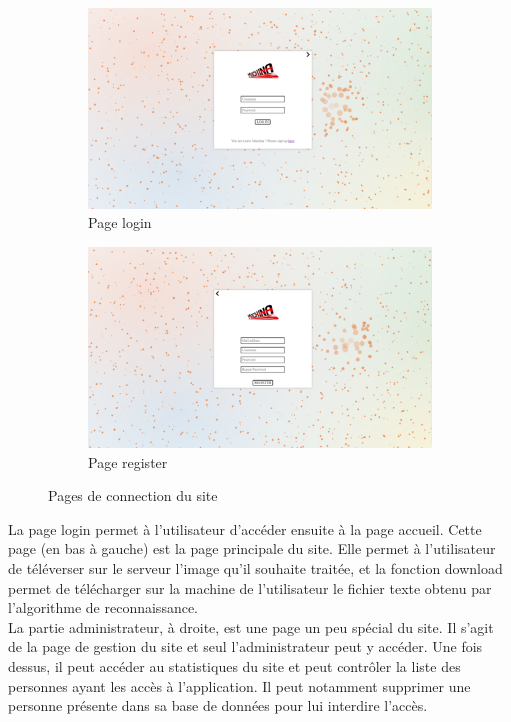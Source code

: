 \documentclass[oneside,a4paper,13pt]{article}
\begin{document}
\begin{figure}[h]
  \begin{subfigure}[b]{0.4\textwidth}
    \includegraphics[width=\textwidth]{Images/login.png}
    \caption{Page login}
    \label{fig:f1}
  \end{subfigure}
  \hfill
  \begin{subfigure}[b]{0.4\textwidth}
    \includegraphics[width=\textwidth]{Images/register.png}
    \caption{Page register}
    \label{fig:f2}
  \end{subfigure}
  \caption{Pages de connection du site}
\end{figure}

La page login permet à l'utilisateur d'accéder ensuite à la page accueil. Cette page (en bas à gauche) est la page principale du site. Elle permet à l'utilisateur de téléverser sur le serveur l'image qu'il souhaite traitée, et la fonction download permet de télécharger sur la machine de l'utilisateur le fichier texte obtenu par l'algorithme de reconnaissance. \\
La partie administrateur, à droite, est une page un peu spécial du site. Il s'agit de la page de gestion du site et seul l'administrateur peut y accéder. Une fois dessus, il peut accéder au statistiques du site et peut contrôler la liste des personnes ayant les accès à l'application. Il peut notamment supprimer une personne présente dans sa base de données pour lui interdire l'accès. 
\end{document}
